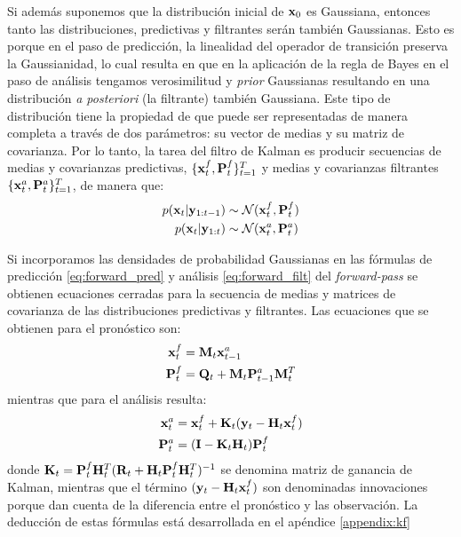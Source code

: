 Si además suponemos que la distribución inicial de $\mathbf{x}_0$ es Gaussiana, entonces tanto las distribuciones, predictivas y filtrantes serán también Gaussianas. Esto es porque en el paso de predicción, la linealidad del operador de transición preserva la Gaussianidad, lo cual resulta en que en la aplicación de la regla de Bayes en el paso de análisis tengamos verosimilitud y \textit{prior} Gaussianas resultando en una distribución \textit{a posteriori} (la filtrante) también Gaussiana. Este tipo de distribución tiene la propiedad de que puede ser representadas de manera completa a través de dos parámetros: su vector de medias y su matriz de covarianza. Por lo tanto, la tarea del filtro de Kalman es producir secuencias de medias y covarianzas predictivas, $\{\mathbf{x}_t^f, \mathbf{P}_t^f\}_{t=1}^{T}$ y medias y covarianzas filtrantes $\{\mathbf{x}_t^a, \mathbf{P}_t^a\}_{t=1}^{T}$, de manera que:
\begin{align*}
    p(\mathbf{x}_t | \mathbf{y}_{1:t-1}) &\sim \mathcal{N}(\mathbf{x}_t^f, \mathbf{P}_t^f) \\
    p(\mathbf{x}_t | \mathbf{y}_{1:t}) &\sim \mathcal{N}(\mathbf{x}_t^a, \mathbf{P}_t^a)
\end{align*}

Si incorporamos las densidades de probabilidad Gaussianas en las fórmulas de predicción \ref{eq:forward_pred} y análisis \ref{eq:forward_filt} del \textit{forward-pass} se obtienen ecuaciones cerradas para la secuencia de medias y matrices de covarianza de las distribuciones predictivas y filtrantes. Las ecuaciones que se obtienen para el pronóstico son:
\begin{align}
    \mathbf{x}_t^f &= \mathbf{M}_t \mathbf{x}_{t-1}^a \label{eq:kf_mean_pred}\\ 
    \mathbf{P}_t^f &= \mathbf{Q}_t + \mathbf{M}_t \mathbf{P}_{t-1}^a \mathbf{M}_t^T \label{eq:kf_var_pred}
\end{align}
mientras que para el análisis resulta:
\begin{align}
    \mathbf{x}_t^a &= \mathbf{x}_t^f + \mathbf{K}_t (\mathbf{y}_t - \mathbf{H}_t \mathbf{x}_t^f) \label{eq:kf_mean_filter} \\ 
    \mathbf{P}_t^a &= (\mathbf{I} - \mathbf{K}_t \mathbf{H}_t) \mathbf{P}_t^f \label{eq:kf_var_filter}
\end{align}
donde $\mathbf{K}_t = \mathbf{P}_t^f \mathbf{H}_t^T(\mathbf{R}_t + \mathbf{H}_t \mathbf{P}_t^f \mathbf{H}_t^T)^{-1}$ se denomina matriz de ganancia de Kalman, mientras que el término $(\mathbf{y}_t - \mathbf{H}_t \mathbf{x}_t^f)$ son denominadas innovaciones porque dan cuenta de la diferencia entre el pronóstico y las observación. La deducción de estas fórmulas está desarrollada en el apéndice \ref{appendix:kf}


